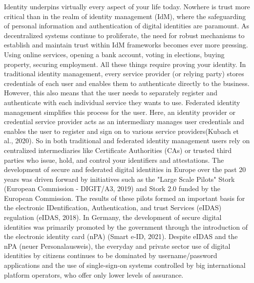 Identity underpins virtually every aspect of your life today. Nowhere is trust more critical than in the realm of identity management (IdM), where the safeguarding of personal information and authentication of digital identities are paramount. As decentralized systems continue to proliferate, the need for robust mechanisms to establish and maintain trust within IdM frameworks becomes ever more pressing. Using online services, opening a bank account, voting in elections, buying property, securing employment. All these things require proving your identity. 
In traditional identity management, every service provider (or relying party) stores credentials of each user and enables them to authenticate directly to the business. However, this also means that the user needs to separately register and authenticate with each individual service they wants to use. Federated identity management simplifies this process for the user. Here, an identity provider or credential service provider acts as an intermediary manages user credentials and enables the user to register and sign on to various service providers(Kubach et al., 2020). So in both traditional and federated identity management users rely on centralized intermediaries like Certificate Authorities (CAs) or trusted third parties who issue, hold, and control your identifiers and attestations. The development of secure and federated digital identities in Europe over the past 20 years was driven forward by initiatives such as the "Large Scale Pilots" Stork (European Commission - DIGIT/A3, 2019) and Stork 2.0 funded by the European Commission. The results of these pilots formed an important basis for the electronic IDentification, Authentication, and trust Services (eIDAS) regulation (eIDAS, 2018). In Germany, the development of secure digital identities was primarily promoted by the government through the introduction of the electronic identity card (nPA) (Smart e-ID, 2021). Despite eIDAS and the nPA (neuer Personalausweis), the everyday and private sector use of digital identities by citizens continues to be dominated by username/password applications and the use of single-sign-on systems controlled by big international platform operators, who offer only lower levels of assurance.

